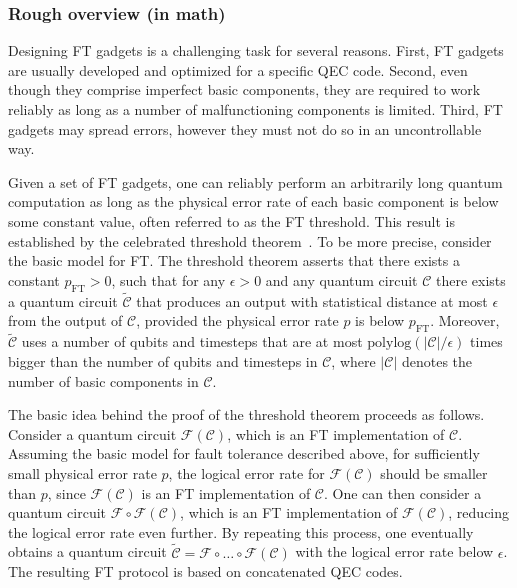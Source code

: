 \begin{refsection}

\subsubsection*{Rough overview (in math)}

Designing FT gadgets is a challenging task for several reasons.
First, FT gadgets are usually developed and optimized for a specific QEC code.
Second, even though they comprise imperfect basic components, they are required to work reliably as long as a number of malfunctioning components is limited.
Third, FT gadgets may spread errors, however they must not do so in an uncontrollable way.  

Given a set of FT gadgets, one can reliably perform an arbitrarily long quantum computation as long as the physical error rate of each basic component is below some constant value, often referred to as the FT threshold.
This result is established by the celebrated threshold theorem~\cite{aharonov1997FTQCconstantError,kitaev1997quantumComputationsAlgosQEC,knill1998ResilientQC,aliferis2006quantum}.
To be more precise, consider the basic model for FT.
The threshold theorem asserts that there exists a constant $p_\text{FT}>0$, such that for any $\epsilon>0$ and any quantum circuit $\mathcal C$ there exists a quantum circuit $\widetilde{\mathcal C}$ that produces an output with statistical distance at most $\epsilon$ from the output of $\mathcal C$, provided the physical error rate $p$ is below $p_\text{FT}$.
Moreover, $\widetilde{\mathcal C}$ uses a number of qubits and timesteps that are at most $\mathrm{polylog}(|\mathcal C|/\epsilon)$ times bigger than the number of qubits and timesteps in $\mathcal C$, where $|\mathcal C|$ denotes the number of basic components in $\mathcal C$.


The basic idea behind the proof of the threshold theorem proceeds as follows.
Consider a quantum circuit $\mathcal F(\mathcal C)$, which is an FT implementation of $\mathcal C$. 
Assuming the basic model for fault tolerance described above, for sufficiently small physical error rate $p$, the logical error rate for $\mathcal F(\mathcal C)$ should be smaller than $p$, since $\mathcal F(\mathcal C)$ is an FT implementation of $\mathcal C$.
One can then consider a quantum circuit $\mathcal F\circ \mathcal F(\mathcal C)$, which is an FT implementation of $\mathcal F(\mathcal C)$, reducing the logical error rate even further.
By repeating this process, one eventually obtains a quantum circuit $\widetilde{\mathcal C} = \mathcal F\circ\ldots \circ \mathcal F(\mathcal C)$ with the logical error rate below $\epsilon$.
The resulting FT protocol is based on concatenated QEC codes.



\end{refsection}
